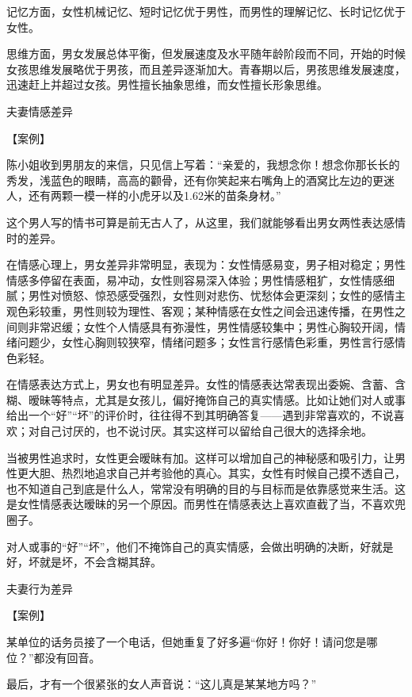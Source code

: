 \documentclass[12pt,UTF8]{ctexbook}
\begin{document}
记忆方面，女性机械记忆、短时记忆优于男性，而男性的理解记忆、长时记忆优于女性。

思维方面，男女发展总体平衡，但发展速度及水平随年龄阶段而不同，开始的时候女孩思维发展略优于男孩，而且差异逐渐加大。青春期以后，男孩思维发展速度，迅速赶上并超过女孩。男性擅长抽象思维，而女性擅长形象思维。





夫妻情感差异


【案例】

陈小姐收到男朋友的来信，只见信上写着：“亲爱的，我想念你！想念你那长长的秀发，浅蓝色的眼睛，高高的颧骨，还有你笑起来右嘴角上的酒窝比左边的更迷人，还有两颗一模一样的小虎牙以及1.62米的苗条身材。”

这个男人写的情书可算是前无古人了，从这里，我们就能够看出男女两性表达感情时的差异。

在情感心理上，男女差异非常明显，表现为：女性情感易变，男子相对稳定；男性情感多停留在表面，易冲动，女性则容易深入体验；男性情感粗犷，女性情感细腻；男性对愤怒、惊恐感受强烈，女性则对悲伤、忧愁体会更深刻；女性的感情主观色彩较重，男性则较为理性、客观；某种情感在女性之间会迅速传播，在男性之间则非常迟缓；女性个人情感具有弥漫性，男性情感较集中；男性心胸较开阔，情绪问题少，女性心胸则较狭窄，情绪问题多；女性言行感情色彩重，男性言行感情色彩轻。

在情感表达方式上，男女也有明显差异。女性的情感表达常表现出委婉、含蓄、含糊、暧昧等特点，尤其是女孩儿，偏好掩饰自己的真实情感。比如让她们对人或事给出一个“好”“坏”的评价时，往往得不到其明确答复——遇到非常喜欢的，不说喜欢；对自己讨厌的，也不说讨厌。其实这样可以留给自己很大的选择余地。

当被男性追求时，女性更会暧昧有加。这样可以增加自己的神秘感和吸引力，让男性更大胆、热烈地追求自己并考验他的真心。其实，女性有时候自己摸不透自己，也不知道自己到底是什么人，常常没有明确的目的与目标而是依靠感觉来生活。这是女性情感表达暧昧的另一个原因。而男性在情感表达上喜欢直截了当，不喜欢兜圈子。

对人或事的“好”“坏”，他们不掩饰自己的真实情感，会做出明确的决断，好就是好，坏就是坏，不会含糊其辞。





夫妻行为差异


【案例】

某单位的话务员接了一个电话，但她重复了好多遍“你好！你好！请问您是哪位？”都没有回音。

最后，才有一个很紧张的女人声音说：“这儿真是某某地方吗？”
\end{document}

